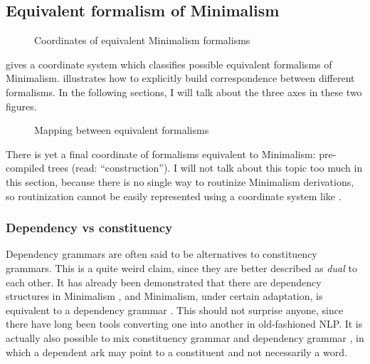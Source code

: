 \documentclass[../main.tex]{subfiles}
\begin{document}


\subsection{Equivalent formalism of Minimalism}

\begin{figure}
    \centering
    
    \caption{Coordinates of equivalent Minimalism formalisms} 
    \label{fig:coordinate-minimalism}
\end{figure}

 gives a coordinate system which classifies possible equivalent formalisms
of Minimalism.  illustrates how to explicitly build correspondence between 
different formalisms. In the following sections, I will talk about the three axes in these two figures. 

\begin{figure}
    \centering
    
    \caption{Mapping between equivalent formalisms}
    \label{fig:minimalism-mapping}
\end{figure}

There is yet a final coordinate of formalisms equivalent to Minimalism: pre-compiled trees 
(read: ``construction''). I will not talk about this topic too much in this section, because there is no 
single way to routinize Minimalism derivations, so routinization cannot be easily represented 
using a coordinate system like .

\subsubsection{Dependency vs constituency}\label{sec:minimalist-dependency}

Dependency grammars are often said to be alternatives to constituency grammars.
This is a quite weird claim, since they are better described as \emph{dual} to each other.
It has already been demonstrated that there are dependency structures in Minimalism \citep{boston2009dependency},
and Minimalism, under certain adaptation, is equivalent to a dependency grammar \citep{osborne2011bare}.
This should not surprise anyone, since there have long been tools converting one into another in old-fashioned NLP.
It is actually also possible to mix constituency grammar and dependency grammar 
\cite{kahane-mazziotta-2015-syntactic}, in which a dependent ark may point to a constituent and not necessarily a word.
\end{document}
